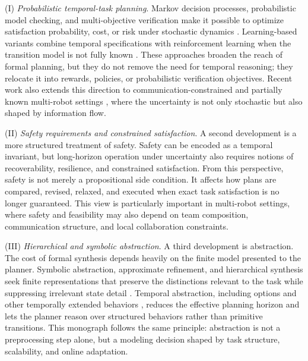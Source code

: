  (I) \emph{Probabilistic temporal-task planning}. Markov decision processes,
probabilistic model checking, and multi-objective verification make it possible to
optimize satisfaction probability, cost, or risk under stochastic dynamics
\citep{ding2011mdp, wolff2012robust, forejt2011quantitative, forejt2012pareto,
kwiatkowska2011prism}. Learning-based variants combine temporal specifications with
reinforcement learning when the transition model is not fully known
\citep{hasanbeig2019reinforcement, bozkurt2020control, wang2015temporal}. These approaches
broaden the reach of formal planning, but they do not remove the need for temporal
reasoning; they relocate it into rewards, policies, or probabilistic verification
objectives. Recent work also extends this direction to communication-constrained and
partially known multi-robot settings \citep{silva2026probabilistic, zhao2025noregret},
where the uncertainty is not only stochastic but also shaped by information flow.

 (II) \emph{Safety requirements and constrained satisfaction}. A second
development is a more structured treatment of safety. Safety can be encoded as a temporal
invariant, but long-horizon operation under uncertainty also requires notions of
recoverability, resilience, and constrained satisfaction.  From this perspective,
safety is not merely a propositional side condition. It affects how plans are compared,
revised, relaxed, and executed when exact task satisfaction is no longer guaranteed. This
view is particularly important in multi-robot settings, where safety and feasibility may
also depend on team composition, communication structure, and local collaboration
constraints.

 (III) \emph{Hierarchical and symbolic abstraction}. A third development is
abstraction. The cost of formal synthesis depends heavily on the finite model presented to
the planner. Symbolic abstraction, approximate refinement, and hierarchical synthesis seek
finite representations that preserve the distinctions relevant to the task while
suppressing irrelevant state detail \citep{tabuada2009verification,
haesaert2018verification, meyer2019hierarchical, nilsson2014incremental}. Temporal
abstraction, including options and other temporally extended behaviors
\citep{sutton1999between}, reduces the effective planning horizon and lets the planner
reason over structured behaviors rather than primitive transitions. This monograph follows
the same principle: abstraction is not a preprocessing step alone, but a modeling decision
shaped by task structure, scalability, and online adaptation.

